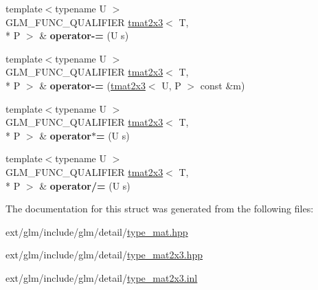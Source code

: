 \begin{DoxyCompactItemize}
\item 
\hypertarget{structglm_1_1tmat2x3_ab20c10a9eacf4c5ba7c68b08d0421b76}{{\footnotesize template$<$typename U $>$ }\\G\-L\-M\-\_\-\-F\-U\-N\-C\-\_\-\-Q\-U\-A\-L\-I\-F\-I\-E\-R \hyperlink{structglm_1_1tmat2x3}{tmat2x3}$<$ T, \\*
P $>$ \& {\bfseries operator-\/=} (U s)}\label{structglm_1_1tmat2x3_ab20c10a9eacf4c5ba7c68b08d0421b76}

\item 
\hypertarget{structglm_1_1tmat2x3_a7c726274f83d7577f62b165eafbb0510}{{\footnotesize template$<$typename U $>$ }\\G\-L\-M\-\_\-\-F\-U\-N\-C\-\_\-\-Q\-U\-A\-L\-I\-F\-I\-E\-R \hyperlink{structglm_1_1tmat2x3}{tmat2x3}$<$ T, \\*
P $>$ \& {\bfseries operator-\/=} (\hyperlink{structglm_1_1tmat2x3}{tmat2x3}$<$ U, P $>$ const \&m)}\label{structglm_1_1tmat2x3_a7c726274f83d7577f62b165eafbb0510}

\item 
\hypertarget{structglm_1_1tmat2x3_a3301a48c44c671556109b4cbf37daf81}{{\footnotesize template$<$typename U $>$ }\\G\-L\-M\-\_\-\-F\-U\-N\-C\-\_\-\-Q\-U\-A\-L\-I\-F\-I\-E\-R \hyperlink{structglm_1_1tmat2x3}{tmat2x3}$<$ T, \\*
P $>$ \& {\bfseries operator$\ast$=} (U s)}\label{structglm_1_1tmat2x3_a3301a48c44c671556109b4cbf37daf81}

\item 
\hypertarget{structglm_1_1tmat2x3_aeb03b749f9cc0705bac20e5c76c7d9d0}{{\footnotesize template$<$typename U $>$ }\\G\-L\-M\-\_\-\-F\-U\-N\-C\-\_\-\-Q\-U\-A\-L\-I\-F\-I\-E\-R \hyperlink{structglm_1_1tmat2x3}{tmat2x3}$<$ T, \\*
P $>$ \& {\bfseries operator/=} (U s)}\label{structglm_1_1tmat2x3_aeb03b749f9cc0705bac20e5c76c7d9d0}

\end{DoxyCompactItemize}


The documentation for this struct was generated from the following files\-:\begin{DoxyCompactItemize}
\item 
ext/glm/include/glm/detail/\hyperlink{type__mat_8hpp}{type\-\_\-mat.\-hpp}\item 
ext/glm/include/glm/detail/\hyperlink{type__mat2x3_8hpp}{type\-\_\-mat2x3.\-hpp}\item 
ext/glm/include/glm/detail/\hyperlink{type__mat2x3_8inl}{type\-\_\-mat2x3.\-inl}\end{DoxyCompactItemize}
